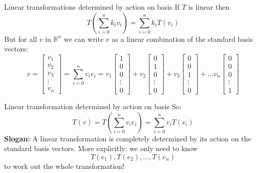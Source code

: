 \documentclass{beamer}
\begin{document}
\begin{frame}{Linear transformations determined by action on basis}
If $T$ is linear then
\begin{equation*}
T\left(\sum_{i=0}^n k_i v_i\right) = \sum_{i=0}^n k_i T(v_i)
\end{equation*}
But for all $v$ in $\mathbb{R}^n$ we can write $v$ as a linear combination of the standard basis vectors:
\begin{equation*}
v = \left[
\begin{array}{c}
v_1\\
v_2\\
v_3\\
\vdots\\
v_n
\end{array}
\right] = \sum_{i=0}^n v_i e_i = v_1 \left[
\begin{array}{c}
1\\
0\\
0\\
\vdots\\
0
\end{array}
\right] + v_2 \left[
\begin{array}{c}
0\\
1\\
0\\
\vdots\\
0
\end{array}
\right] + v_3 \left[
\begin{array}{c}
0\\
0\\
1\\
\vdots\\
0
\end{array}
\right]+\dots v_n \left[
\begin{array}{c}
0\\
0\\
0\\
\vdots\\
1
\end{array}
\right]
\end{equation*}
\end{frame}

\begin{frame}{Linear transformation determined by action on basis}
So:
\begin{equation*}
T(v) = T\left(\sum_{i=0}^n v_i e_i\right) = \sum_{i=0}^n v_i T(e_i)
\end{equation*}\vfill
{\bf Slogan:} A linear transformation is completely determined by its action on the standard basis vectors.\vfill
More explicitly: we only need to know
\begin{equation*}
T(e_1), T(e_2),\dots, T(e_n)
\end{equation*}
to work out the whole transformation!
\end{frame}
\end{document}
